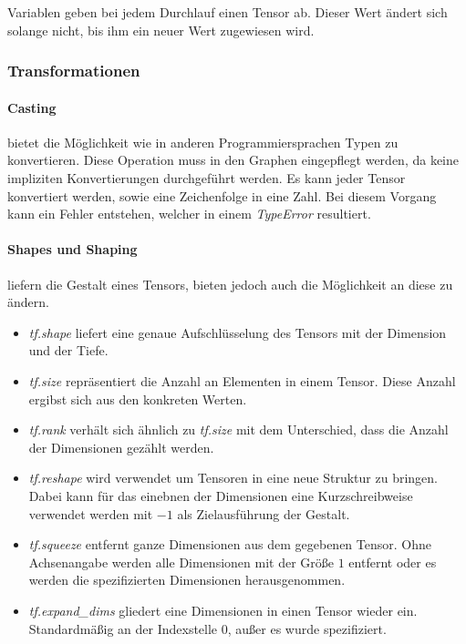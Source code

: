 Variablen geben bei jedem Durchlauf einen Tensor ab.
Dieser Wert ändert sich solange nicht, bis ihm ein neuer Wert zugewiesen wird. 

\subsubsection{Transformationen}

\paragraph{Casting} bietet die Möglichkeit wie in anderen Programmiersprachen Typen zu konvertieren. 
Diese Operation muss in den Graphen eingepflegt werden, da keine impliziten Konvertierungen durchgeführt werden. 
Es kann jeder Tensor konvertiert werden, sowie eine Zeichenfolge in eine Zahl. 
Bei diesem Vorgang kann ein Fehler entstehen, welcher in einem \textit{TypeError} resultiert.

\paragraph{Shapes und Shaping} liefern die Gestalt eines Tensors, bieten jedoch auch die Möglichkeit an diese zu ändern. 
\begin{itemize}
	\item \textit{tf.shape} liefert eine genaue Aufschlüsselung des Tensors mit der Dimension und der Tiefe.
	\item \textit{tf.size} repräsentiert die Anzahl an Elementen in einem Tensor. 
	Diese Anzahl ergibst sich aus den konkreten Werten.
	\item \textit{tf.rank} verhält sich ähnlich zu \textit{tf.size} mit dem Unterschied, dass die Anzahl der Dimensionen gezählt werden.
	\item \textit{tf.reshape} wird verwendet um Tensoren in eine neue Struktur zu bringen. 
	Dabei kann für das einebnen der Dimensionen eine Kurzschreibweise verwendet werden mit $-1$ als Zielausführung der Gestalt.
	\item \textit{tf.squeeze} entfernt ganze Dimensionen aus dem gegebenen Tensor. 
	Ohne Achsenangabe werden alle Dimensionen mit der Größe $1$ entfernt oder es werden die spezifizierten Dimensionen herausgenommen.
	\item \textit{tf.expand\_dims} gliedert eine Dimensionen in einen Tensor wieder ein. 
	Standardmäßig an der Indexstelle $0$, außer es wurde spezifiziert.
\end{itemize}

